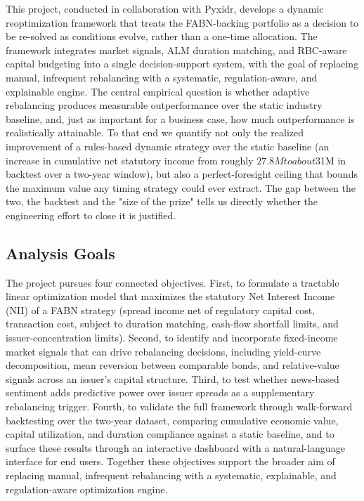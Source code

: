 \documentclass[12pt]{article}
\begin{document}
This project, conducted in collaboration with Pyxidr, develops a dynamic reoptimization framework that treats the FABN-backing portfolio as a decision to be re-solved as conditions evolve, rather than a one-time allocation. The framework integrates market signals, ALM duration matching, and RBC-aware capital budgeting into a single decision-support system, with the goal of replacing manual, infrequent rebalancing with a systematic, regulation-aware, and explainable engine. The central empirical question is whether adaptive rebalancing produces measurable outperformance over the static industry baseline, and, just as important for a business case, how much outperformance is realistically attainable. To that end we quantify not only the realized improvement of a rules-based dynamic strategy over the static baseline (an increase in cumulative net statutory income from roughly $27.8M to about $31M in backtest over a two-year window), but also a perfect-foresight ceiling that bounds the maximum value any timing strategy could ever extract. The gap between the two, the backtest and the "size of the prize" tells us directly whether the engineering effort to close it is justified.


\subsection{Analysis Goals}

The project pursues four connected objectives. First, to formulate a tractable linear optimization model that maximizes the statutory Net Interest Income (NII) of a FABN strategy (spread income net of regulatory capital cost, transaction cost, subject to duration matching, cash-flow shortfall limits, and issuer-concentration limits). Second, to identify and incorporate fixed-income market signals that can drive rebalancing decisions, including yield-curve decomposition, mean reversion between comparable bonds, and relative-value signals across an issuer's capital structure. Third, to test whether news-based sentiment adds predictive power over issuer spreads as a supplementary rebalancing trigger. Fourth, to validate the full framework through walk-forward backtesting over the two-year dataset, comparing cumulative economic value, capital utilization, and duration compliance against a static baseline, and to surface these results through an interactive dashboard with a natural-language interface for end users. Together these objectives support the broader aim of replacing manual, infrequent rebalancing with a systematic, explainable, and regulation-aware optimization engine.
\end{document}

